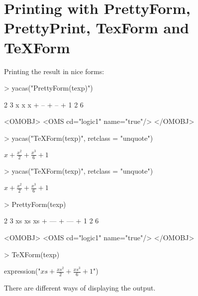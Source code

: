 \documentclass[10pt]{article}
\begin{document}
\section{Printing with PrettyForm, PrettyPrint, TexForm and  TeXForm}
\label{sec:printing}



Printing the result in nice forms:
\begin{Schunk}
\begin{Sinput}
> yacas("PrettyForm(texp)")
\end{Sinput}
\begin{Soutput}
     2    3    
    x    x     
x + -- + -- + 1
    2    6     

<OMOBJ>
  <OMS cd="logic1" name="true"/>
</OMOBJ>
\end{Soutput}
\begin{Sinput}
> yacas("TeXForm(texp)", retclass = "unquote")
\end{Sinput}
\begin{Soutput}
$x + \frac{x ^{2}}{2}  + \frac{x ^{3}}{6}  + 1$
\end{Soutput}
\end{Schunk}


\begin{Schunk}
\begin{Sinput}
> yacas("TeXForm(texp)", retclass = "unquote")
\end{Sinput}
$x + \frac{x ^{2}}{2}  + \frac{x ^{3}}{6}  + 1$\end{Schunk}


\begin{Schunk}
\begin{Sinput}
> PrettyForm(texp)
\end{Sinput}
\begin{Soutput}
       2     3    
     xs    xs     
xs + --- + --- + 1
      2     6     

<OMOBJ>
  <OMS cd="logic1" name="true"/>
</OMOBJ>
\end{Soutput}
\begin{Sinput}
> TeXForm(texp)
\end{Sinput}
\begin{Soutput}
expression("$xs + \frac{xs ^{2}}{2}  + \frac{xs ^{3}}{6}  + 1$")
\end{Soutput}
\end{Schunk}

There are different ways of displaying the output.
\end{document}
